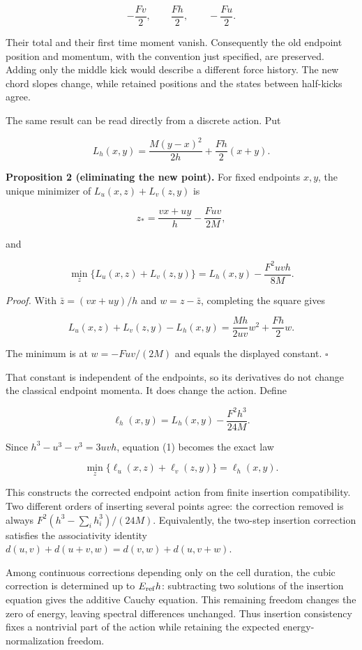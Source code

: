 \documentclass[11pt,a4paper]{article}
\begin{document}
\[-\frac{Fv}{2},\qquad \frac{Fh}{2},\qquad -\frac{Fu}{2}.\]

Their total and their first time moment vanish. Consequently the old
endpoint position and momentum, with the convention just specified, are
preserved. Adding only the middle kick would describe a different force
history. The new chord slopes change, while retained positions and the
states between half-kicks agree.

The same result can be read directly from a discrete action. Put

\[L_h(x,y)=\frac{M(y-x)^2}{2h}+\frac{Fh}{2}(x+y).\]

\textbf{Proposition 2 (eliminating the new point).} For fixed endpoints
\(x,y\), the unique minimizer of \(L_u(x,z)+L_v(z,y)\) is

\[z_* =\frac{vx+uy}{h}-\frac{Fuv}{2M},\]

and

\[\min_z\{L_u(x,z)+L_v(z,y)\}
=L_h(x,y)-\frac{F^2uvh}{8M}. \tag{1}\]

\emph{Proof.} With \(\bar z=(vx+uy)/h\) and \(w=z-\bar z\), completing
the square gives

\[L_u(x,z)+L_v(z,y)-L_h(x,y)
=\frac{Mh}{2uv}w^2+\frac{Fh}{2}w.\]

The minimum is at \(w=-Fuv/(2M)\) and equals the displayed constant.
\(\square\)

That constant is independent of the endpoints, so its derivatives do not
change the classical endpoint momenta. It does change the action. Define

\[\ell_h(x,y)=L_h(x,y)-\frac{F^2h^3}{24M}.\]

Since \(h^3-u^3-v^3=3uvh\), equation (1) becomes the exact law

\[\min_z\{\ell_u(x,z)+\ell_v(z,y)\}=\ell_h(x,y). \tag{2}\]

This constructs the corrected endpoint action from finite insertion
compatibility. Two different orders of inserting several points agree:
the correction removed is always \(F^2(h^3-\sum_i h_i^3)/(24M)\).
Equivalently, the two-step insertion correction satisfies the
associativity identity \(d(u,v)+d(u+v,w)=d(v,w)+d(u,v+w)\).

Among continuous corrections depending only on the cell duration, the
cubic correction is determined up to \(E_{\rm ref}h\): subtracting two
solutions of the insertion equation gives the additive Cauchy equation.
This remaining freedom changes the zero of energy, leaving spectral
differences unchanged. Thus insertion consistency fixes a nontrivial
part of the action while retaining the expected energy-normalization
freedom.
\end{document}
